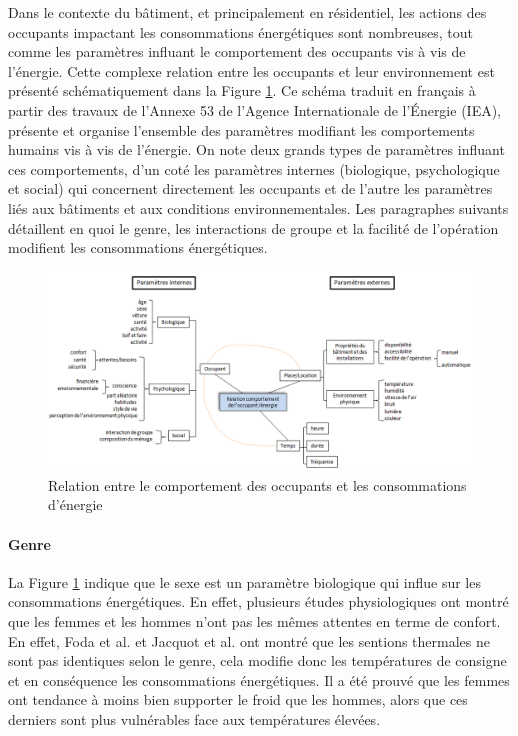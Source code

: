 Dans le contexte du bâtiment, et principalement en résidentiel, les actions des occupants impactant les consommations énergétiques sont nombreuses, tout comme les paramètres influant le comportement des occupants vis à vis de l'énergie. Cette complexe relation entre les occupants et leur environnement est présenté schématiquement dans la Figure \ref{fig:Comportement_occupant_energie}. Ce schéma traduit en français à partir des travaux de l'Annexe 53 \cite{Annex-53-1} de l'Agence Internationale de l'Énergie (IEA), présente et organise l'ensemble des paramètres modifiant les comportements humains vis à vis de l'énergie. On note deux grands types de paramètres influant ces comportements, d'un coté les paramètres internes (biologique, psychologique et social) qui concernent directement les occupants et de l'autre les paramètres liés aux bâtiments et aux conditions environnementales. Les paragraphes suivants détaillent en quoi le genre, les interactions de groupe et la facilité de l'opération modifient les consommations énergétiques.

\begin{figure}[h]
\centering
\includegraphics[scale=0.6]{Images/Comportement_occupant_energie}
\caption{Relation entre le comportement des occupants et les consommations d'énergie}
\label{fig:Comportement_occupant_energie}
\end{figure}

\paragraph{Genre}

La Figure \ref{fig:Comportement_occupant_energie} indique que le sexe est un paramètre biologique qui influe sur les consommations énergétiques. En effet, plusieurs études physiologiques ont montré que les femmes et les hommes n'ont pas les mêmes attentes en terme de confort. En effet, Foda et al. \cite{Foda-11} et Jacquot et al. \cite{Jacquot-14} ont montré que les sentions thermales ne sont pas identiques selon le genre, cela modifie donc les températures de consigne et en conséquence les consommations énergétiques. Il a été prouvé que les femmes ont tendance à moins bien supporter le froid que les hommes, alors que ces derniers sont plus vulnérables face aux températures élevées.


